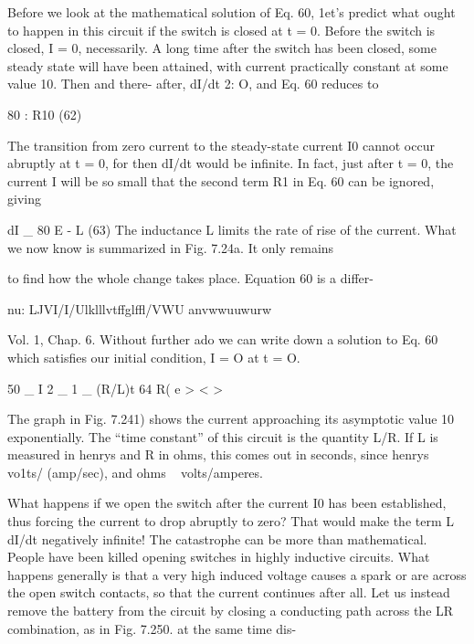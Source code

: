 Before we look at the mathematical solution of Eq. 60, 1et's predict
what ought to happen in this circuit if the switch is closed at t = 0.
Before the switch is closed, I = 0, necessarily. A long time after the
switch has been closed, some steady state will have been attained,
with current practically constant at some value 10. Then and there-
after, dI/dt 2: O, and Eq. 60 reduces to

\begin{equation}
\end{equation}
80 : R10 (62)

The transition from zero current to the steady-state current I0 cannot
occur abruptly at t = 0, for then dI/dt would be infinite. In fact,
just after t = 0, the current I will be so small that the second term
R1 in Eq. 60 can be ignored, giving

\begin{equation}
\end{equation}
dI _ 80
E - L (63)
The inductance L limits the rate of rise of the current.
What we now know is summarized in Fig. 7.24a. It only remains

to find how the whole change takes place. Equation 60 is a differ-

nu: LJVI/I/Ulklllvtffglffl/VWU anvwwuuwurw

Vol. 1, Chap. 6. Without further ado we can write down a solution
to Eq. 60 which satisfies our initial condition, I = O at t = O.

\begin{equation}
\end{equation}
50 _
I 2 _ 1 _ (R/L)t 64
R( e > < >

The graph in Fig. 7.241) shows the current approaching its asymptotic
value 10 exponentially. The ``time constant'' of this circuit is
the quantity L/R. If L is measured in henrys and R in ohms, this
comes out in seconds, since henrys ~ vo1ts/ (amp/sec), and
ohms ~ volts/amperes.

What happens if we open the switch after the current I0 has been
established, thus forcing the current to drop abruptly to zero? That
would make the term L dI/dt negatively infinite! The catastrophe
can be more than mathematical. People have been killed opening
switches in highly inductive circuits. What happens generally is that
a very high induced voltage causes a spark or are across the open
switch contacts, so that the current continues after all. Let us instead
remove the battery from the circuit by closing a conducting
path across the LR combination, as in Fig. 7.250. at the same time dis-

